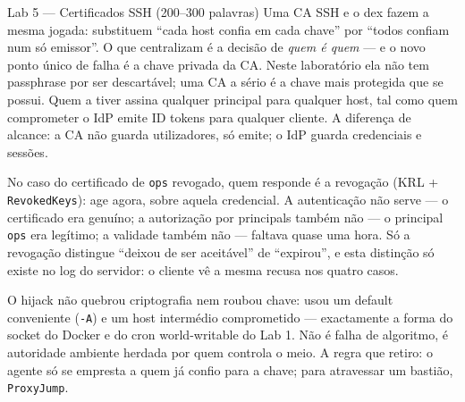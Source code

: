 \documentclass[a4paper,11pt]{article}
\newcommand{\cmd}[1]{\textcolor{sscnblue}{\texttt{#1}}}
\begin{document}
\begin{callout}{Lab 5 --- Certificados SSH (200--300 palavras)}
Uma CA SSH e o dex fazem a mesma jogada: substituem ``cada host confia em cada chave'' por
``todos confiam num s\'o emissor''. O que centralizam \'e a decis\~ao de \emph{quem \'e
quem} --- e o novo ponto \'unico de falha \'e a chave privada da CA. Neste laborat\'orio
ela n\~ao tem passphrase por ser descart\'avel; uma CA a s\'erio \'e a chave mais
protegida que se possui. Quem a tiver assina qualquer principal para qualquer host, tal
como quem comprometer o IdP emite ID tokens para qualquer cliente. A diferen\c{c}a de
alcance: a CA n\~ao guarda utilizadores, s\'o emite; o IdP guarda credenciais e sess\~oes.

No caso do certificado de \cmd{ops} revogado, quem responde \'e a revoga\c{c}\~ao
(KRL + \cmd{RevokedKeys}): age agora, sobre aquela credencial. A autentica\c{c}\~ao n\~ao
serve --- o certificado era genu\'ino; a autoriza\c{c}\~ao por principals tamb\'em n\~ao
--- o principal \cmd{ops} era leg\'itimo; a validade tamb\'em n\~ao --- faltava quase uma
hora. S\'o a revoga\c{c}\~ao distingue ``deixou de ser aceit\'avel'' de ``expirou'', e
esta distin\c{c}\~ao s\'o existe no log do servidor: o cliente v\^e a mesma recusa nos
quatro casos.

O hijack n\~ao quebrou criptografia nem roubou chave: usou um default conveniente
(\cmd{-A}) e um host interm\'edio comprometido --- exactamente a forma do socket do Docker
e do cron world-writable do Lab 1. N\~ao \'e falha de algoritmo, \'e autoridade ambiente
herdada por quem controla o meio. A regra que retiro: o agente s\'o se empresta a quem j\'a
confio para a chave; para atravessar um basti\~ao, \cmd{ProxyJump}.
\end{callout}
\end{document}
